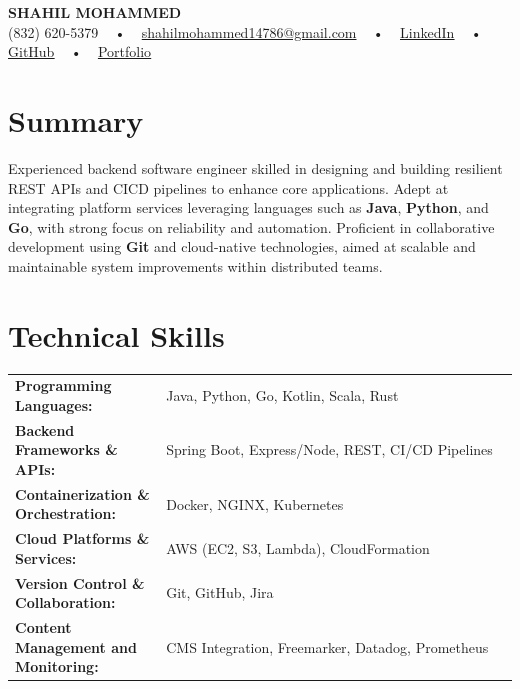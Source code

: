 \documentclass[letterpaper,11pt]{article}
\begin{document}
\begin{center}
    {\fontsize{14pt}{12pt}\selectfont \textbf{\MakeUppercase{Shahil Mohammed}}}\\ \vspace{2pt}
    \fontsize{10pt}{12pt}\selectfont (832) 620-5379 ~ • ~ \href{mailto:shahilmohammed14786@gmail.com}{shahilmohammed14786@gmail.com} ~ • ~  
    \href{https://www.linkedin.com/in/shahil-mohammed-9652931a1/}{\color{blue}\underline{LinkedIn}}  ~ • ~ 
    \href{https://github.com/freakbeast14}{\color{blue}\underline{GitHub}} ~ • ~ 
    \href{https://shahil-mohammed.netlify.app/}{\color{blue}\underline{Portfolio}}
    \vspace{-8pt}
\end{center}

\section{Summary}
\fontsize{9pt}{10pt}\selectfont
Experienced backend software engineer skilled in designing and building resilient REST APIs and CICD pipelines to enhance core applications. Adept at integrating platform services leveraging languages such as \textbf{Java}, \textbf{Python}, and \textbf{Go}, with strong focus on reliability and automation. Proficient in collaborative development using \textbf{Git} and cloud-native technologies, aimed at scalable and maintainable system improvements within distributed teams.
 \vspace{-5pt}
 
\section{Technical Skills}
        \vspace{-14pt}
        \begin{table}[h]
            \fontsize{9pt}{10pt}\selectfont
            \begin{tabular}{p{0.3\linewidth} p{0.7\linewidth}}
                \textbf{Programming Languages:} & Java, Python, Go, Kotlin, Scala, Rust \\
                \textbf{Backend Frameworks \& APIs:} & Spring Boot, Express/Node, REST, CI/CD Pipelines \\
                \textbf{Containerization \& Orchestration:} & Docker, NGINX, Kubernetes \\
                \textbf{Cloud Platforms \& Services:} & AWS (EC2, S3, Lambda), CloudFormation \\
                \textbf{Version Control \& Collaboration:} & Git, GitHub, Jira \\
                \textbf{Content Management and Monitoring:} & CMS Integration, Freemarker, Datadog, Prometheus \\
            \end{tabular}
        \end{table}
 \vspace{-15pt}
 
\end{document}
